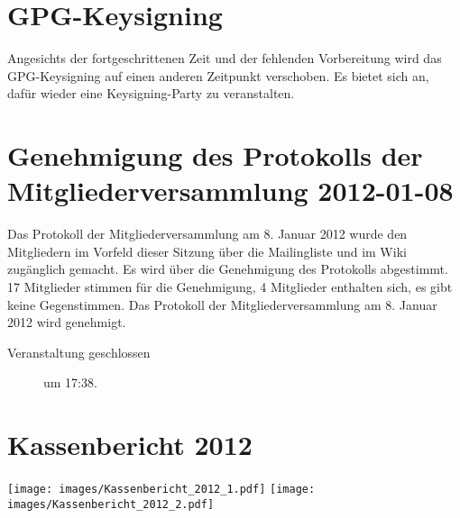 \documentclass[a4paper,12pt]{scrartcl}
\begin{document}
\section{GPG-Keysigning}
\postponed
Angesichts der fortgeschrittenen Zeit und der fehlenden Vorbereitung wird das
GPG-Keysigning auf einen anderen Zeitpunkt verschoben. Es bietet sich an, dafür
wieder eine Keysigning-Party zu veranstalten.

\section{Genehmigung des Protokolls der Mitgliederversammlung 2012-01-08}
Das Protokoll der Mitgliederversammlung am 8. Januar 2012 wurde den Mitgliedern
im Vorfeld dieser Sitzung über die Mailingliste und im Wiki zugänglich gemacht.
Es wird über die Genehmigung des Protokolls abgestimmt. 17 Mitglieder stimmen
für die Genehmigung, 4 Mitglieder enthalten sich, es gibt keine Gegenstimmen.
Das Protokoll der Mitgliederversammlung am 8. Januar 2012 wird genehmigt.

\begin{description}
  \item[Veranstaltung geschlossen] um 17:38.
\end{description}

\appendix

\cleardoublepage
\section{Kassenbericht 2012}\label{sec:kassenbericht}
\enlargethispage{4\baselineskip}
\texttt{[image: images/Kassenbericht\_2012\_1.pdf]}
\newpage
\texttt{[image: images/Kassenbericht\_2012\_2.pdf]}

\end{document}
